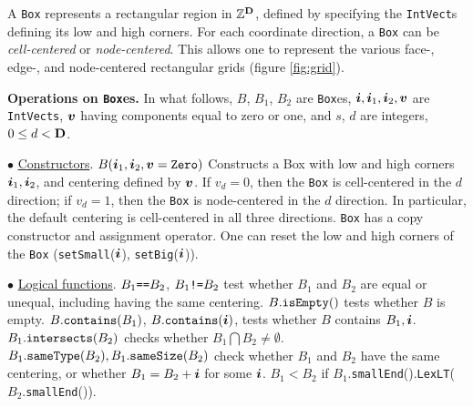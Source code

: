 A \verb|Box| represents a rectangular region in ${\mathbb Z}^{\mathbf{D}}$, defined by
specifying the {\tt IntVect}s defining its low and high corners. 
For each coordinate direction, a {\tt Box} can be {\it cell-centered}
or {\it node-centered}. This allows one to represent the various face-,
edge-, and node-centered rectangular grids 
(figure \ref{fig:grid}). 

\noindent
{\bf Operations on {\tt{Box}}es.}  In what follows, $B$, 
$B_1$, $B_2$ 
are {\tt{Box}}es, ${\boldsymbol{i}}, {\boldsymbol{i}}_1, {\boldsymbol{i}}_2, {\boldsymbol{v}}$ are
{\tt{IntVects}}, ${\boldsymbol{v}}$ having components equal to zero or one, and
$s$, $d$ are integers, $0 \leq d < {\mathbf{D}}$.
\begin{trivlist}

\item $\bullet$ \underline{Constructors}.  $B({\boldsymbol{i}}_{1}, {\boldsymbol{i}}_{2}, {\boldsymbol{v}} = {\tt{Zero}})$
Constructs a Box with low and high corners ${\boldsymbol{i}}_{1}, {\boldsymbol{i}}_{2}$, and
centering defined by ${\boldsymbol{v}}$. If $v_d = 0$, then the {\tt Box} is
cell-centered in the $d$ direction; if $v_d = 1$, then the {\tt Box} is
node-centered in the $d$ direction. In particular, 
the default centering is cell-centered
in all three directions.  {\tt{Box}} has a copy constructor and
assignment operator.  One can reset the low and high corners of the
{\tt{Box}} ({\tt{setSmall}}(${\boldsymbol{i}}$), {\tt{setBig}}(${\boldsymbol{i}}$)).

\item $\bullet$ \underline{Logical functions}.  $B_1\mbox{{\tt{==}}}B_2$, 
$B_1\mbox{{\tt{!=}}}B_2$ test whether $B_1$ and $B_2$
are equal or unequal, including having the same centering.
$B.{\tt{isEmpty}}()$ tests whether $B$ is empty.
$B.{\tt{contains}}(B_1)$, $B.{\tt{contains}}({\boldsymbol{i}})$, tests whether $B$
contains $B_1, {\boldsymbol{i}}$.  $B_1.{\tt{intersects}}(B_2)$ checks whether 
$B_1 \bigcap B_2 \neq \emptyset$.  $B_1.{\tt{sameType}}(B_2),
B_1.{\tt{sameSize}}(B_2)$ check whether $B_1$ and $B_2$ have the same
centering, or whether $B_1 = B_2 + {\boldsymbol{i}}$ for some ${\boldsymbol{i}}$.
$B_1<B_2$ if $B_1$.{\tt{smallEnd}}().{\tt{LexLT}}($B_2.${\tt{smallEnd}}()).


\end{trivlist}
